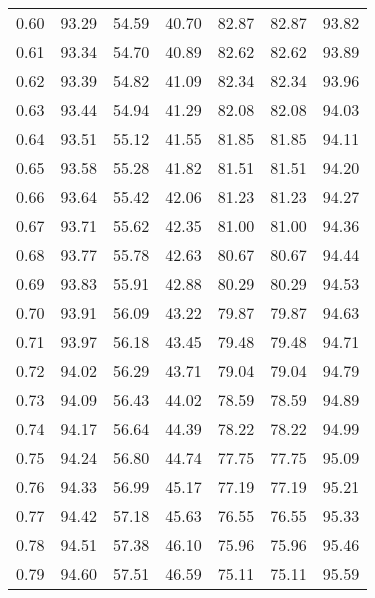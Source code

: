 \begin{tabular}{|c|c|c|c|c|c|c|}
      0.60 &     93.29 &     54.59 &      40.70 &   82.87 &      82.87 &         93.82 \\
      0.61 &     93.34 &     54.70 &      40.89 &   82.62 &      82.62 &         93.89 \\
      0.62 &     93.39 &     54.82 &      41.09 &   82.34 &      82.34 &         93.96 \\
      0.63 &     93.44 &     54.94 &      41.29 &   82.08 &      82.08 &         94.03 \\
      0.64 &     93.51 &     55.12 &      41.55 &   81.85 &      81.85 &         94.11 \\
      0.65 &     93.58 &     55.28 &      41.82 &   81.51 &      81.51 &         94.20 \\
      0.66 &     93.64 &     55.42 &      42.06 &   81.23 &      81.23 &         94.27 \\
      0.67 &     93.71 &     55.62 &      42.35 &   81.00 &      81.00 &         94.36 \\
      0.68 &     93.77 &     55.78 &      42.63 &   80.67 &      80.67 &         94.44 \\
      0.69 &     93.83 &     55.91 &      42.88 &   80.29 &      80.29 &         94.53 \\
      0.70 &     93.91 &     56.09 &      43.22 &   79.87 &      79.87 &         94.63 \\
      0.71 &     93.97 &     56.18 &      43.45 &   79.48 &      79.48 &         94.71 \\
      0.72 &     94.02 &     56.29 &      43.71 &   79.04 &      79.04 &         94.79 \\
      0.73 &     94.09 &     56.43 &      44.02 &   78.59 &      78.59 &         94.89 \\
      0.74 &     94.17 &     56.64 &      44.39 &   78.22 &      78.22 &         94.99 \\
      0.75 &     94.24 &     56.80 &      44.74 &   77.75 &      77.75 &         95.09 \\
      0.76 &     94.33 &     56.99 &      45.17 &   77.19 &      77.19 &         95.21 \\
      0.77 &     94.42 &     57.18 &      45.63 &   76.55 &      76.55 &         95.33 \\
      0.78 &     94.51 &     57.38 &      46.10 &   75.96 &      75.96 &         95.46 \\
      0.79 &     94.60 &     57.51 &      46.59 &   75.11 &      75.11 &         95.59 \\

\end{tabular}
